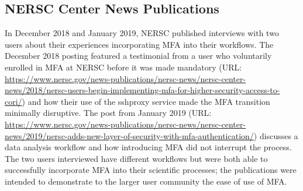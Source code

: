 \documentclass[sigconf,review]{acmart}
\begin{document}
\subsection{NERSC Center News Publications}
\label{pubs}

In December 2018 and January 2019, NERSC published interviews with two users
about their experiences incorporating MFA into their workflows. The December
2018 posting featured a testimonial from a user who voluntarily enrolled in MFA
at NERSC before it was made mandatory
(URL: \url{https://www.nersc.gov/news-publications/nersc-news/nersc-center-news/2018/nersc-users-begin-implementing-mfa-for-higher-security-access-to-cori/})
and how their use of the sshproxy service made the MFA transition minimally
disruptive. The post from January 2019
(URL: \url{https://www.nersc.gov/news-publications/nersc-news/nersc-center-news/2019/nersc-adds-new-layer-of-security-with-mfa-authentication/})
discusses a data analysis workflow and how introducing MFA did not interrupt
the process. The two users interviewed have different workflows but were both
able to successfully incorporate MFA into their scientific processes; the
publications were intended to demonstrate to the larger user community the
ease of use of MFA.
\end{document}
